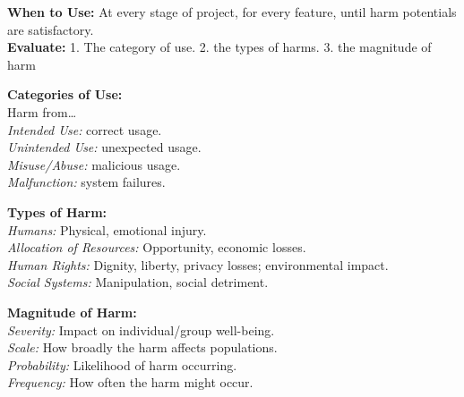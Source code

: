 \documentclass[8pt, a4paper]{extarticle}
\begin{document}
\begin{minipage}[t]{0.49\textwidth}
{\begin{minipage}[t]{1\textwidth}
			\textbf{When to Use:} At every stage of project, for every feature, until harm potentials are satisfactory.\\
			\textbf{Evaluate:} 1. The category of use. 2. the types of harms. 3. the magnitude of harm\\
			\begin{minipage}[t]{0.24\textwidth}
				\textbf{Categories of Use:}\\Harm from\dots\\
				\textit{Intended Use:} correct usage.\\
				\textit{Unintended Use:} unexpected usage.\\
				\textit{Misuse/Abuse:} malicious usage.\\
				\textit{Malfunction:} system failures.
			\end{minipage}\hfill
			\begin{minipage}[t]{0.37\textwidth}
				\textbf{Types of Harm:}\\
				\textit{Humans:} Physical, emotional injury.\\
				\textit{Allocation of Resources:} Opportunity, economic losses.\\
				\textit{Human Rights:} Dignity, liberty, privacy losses; environmental impact.\\
				\textit{Social Systems:} Manipulation, social detriment.
			\end{minipage}\hfill
			\begin{minipage}[t]{0.37\textwidth}
				\textbf{Magnitude of Harm:}\\
				\textit{Severity:} Impact on individual/group well-being.\\
				\textit{Scale:} How broadly the harm affects populations.\\
				\textit{Probability:} Likelihood of harm occurring.\\
				\textit{Frequency:} How often the harm might occur.
			\end{minipage}\normalsize
		\end{minipage}}
\end{minipage}
\end{document}
